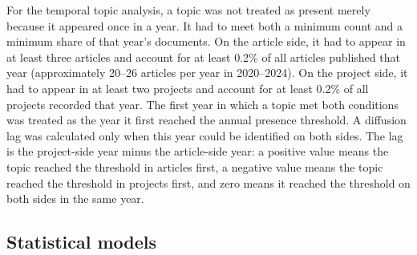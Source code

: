 \documentclass[pdflatex,sn-apa]{sn-jnl}
\begin{document}
For the temporal topic analysis, a topic was not treated as present merely because it appeared once in a year. It had to meet both a minimum count and a minimum share of that year's documents. On the article side, it had to appear in at least three articles and account for at least 0.2\% of all articles published that year (approximately 20--26 articles per year in 2020--2024). On the project side, it had to appear in at least two projects and account for at least 0.2\% of all projects recorded that year. The first year in which a topic met both conditions was treated as the year it first reached the annual presence threshold. A diffusion lag was calculated only when this year could be identified on both sides. The lag is the project-side year minus the article-side year: a positive value means the topic reached the threshold in articles first, a negative value means the topic reached the threshold in projects first, and zero means it reached the threshold on both sides in the same year.

\subsection{Statistical models}
\end{document}
